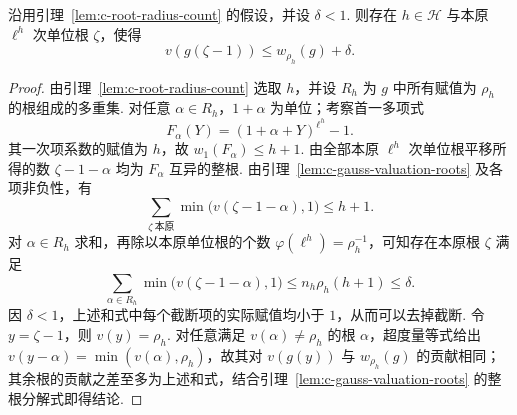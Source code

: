 \begin{lemma}[一元多项式在单位根处的取值]
\label{lem:c-root-one-variable}
\emitthmsource
沿用引理~\ref{lem:c-root-radius-count} 的假设，并设 $\delta<1$.
则存在 $h\in\mathcal H$ 与本原 $\ell^h$ 次单位根 $\zeta$，使得
\[
 v(g(\zeta-1))\le w_{\rho_h}(g)+\delta.
\]
\end{lemma}
\begin{proof}
由引理~\ref{lem:c-root-radius-count} 选取 $h$，并设 $R_h$ 为 $g$ 中所有赋值为 $\rho_h$ 的根组成的多重集. 对任意 $\alpha\in R_h$，$1+\alpha$ 为单位；考察首一多项式
\[
 F_\alpha(Y)=(1+\alpha+Y)^{\ell^h}-1 .
\]
其一次项系数的赋值为 $h$，故 $w_1(F_\alpha)\le h+1$.
由全部本原 $\ell^h$ 次单位根平移所得的数 $\zeta-1-\alpha$ 均为 $F_\alpha$ 互异的整根.
由引理~\ref{lem:c-gauss-valuation-roots} 及各项非负性，有
\[
 \sum_{\zeta\ \text{本原}}\min\bigl(v(\zeta-1-\alpha),1\bigr)\le h+1.
\]
对 $\alpha\in R_h$ 求和，再除以本原单位根的个数 $\varphi(\ell^h)=\rho_h^{-1}$，可知存在本原根 $\zeta$ 满足
\[
 \sum_{\alpha\in R_h}\min\bigl(v(\zeta-1-\alpha),1\bigr)
 \le n_h\rho_h(h+1)\le\delta.
\]
因 $\delta<1$，上述和式中每个截断项的实际赋值均小于 $1$，从而可以去掉截断.
令 $y=\zeta-1$，则 $v(y)=\rho_h$.
对任意满足 $v(\alpha)\ne\rho_h$ 的根 $\alpha$，超度量等式给出 $v(y-\alpha)=\min(v(\alpha),\rho_h)$，故其对 $v(g(y))$ 与 $w_{\rho_h}(g)$ 的贡献相同；其余根的贡献之差至多为上述和式，结合引理~\ref{lem:c-gauss-valuation-roots} 的整根分解式即得结论.
\end{proof}

